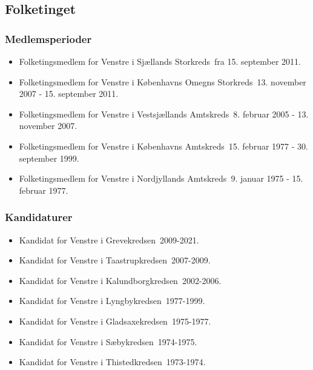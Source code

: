 \documentclass[11pt, a4paper]{awesome-cv}
\begin{document}
\begin{cvletter}
\subsection*{Folketinget}
\subsubsection*{Medlemsperioder}
\begin{itemize}
\item Folketingsmedlem for Venstre i Sjællands Storkreds fra 15. september 2011.
\item Folketingsmedlem for Venstre i Københavns Omegns Storkreds 13. november 2007 - 15. september 2011.
\item Folketingsmedlem for Venstre i Vestsjællands Amtskreds 8. februar 2005 - 13. november 2007.
\item Folketingsmedlem for Venstre i Københavns Amtskreds 15. februar 1977 - 30. september 1999.
\item Folketingsmedlem for Venstre i Nordjyllands Amtskreds 9. januar 1975 - 15. februar 1977.
\end{itemize}
\subsubsection*{Kandidaturer}
\begin{itemize}
\item Kandidat for Venstre i Grevekredsen 2009-2021.
\item Kandidat for Venstre i Taastrupkredsen 2007-2009.
\item Kandidat for Venstre i Kalundborgkredsen 2002-2006.
\item Kandidat for Venstre i Lyngbykredsen 1977-1999.
\item Kandidat for Venstre i Gladsaxekredsen 1975-1977.
\item Kandidat for Venstre i Sæbykredsen 1974-1975.
\item Kandidat for Venstre i Thistedkredsen 1973-1974.
\end{itemize}

\end{cvletter}
\end{document}
